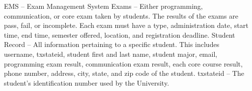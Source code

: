 
   EMS -- Exam Management System 
   Exams  -- Either programming, communication, or core exam taken by students.
      The results of the exams are pass, fail, or incomplete. Each exam must
      have a type, administration date, start time, end time, semester offered,
      location, and registration deadline.
   Student Record  -- All information pertaining to a specific student. This
      includes username, txstateid, student first and last name, student major,
      email, programming exam result, communication exam result, each core
      course result, phone number, address, city, state, and zip code of the
      student.
   txstateid -- The student's identification number used by the University.
